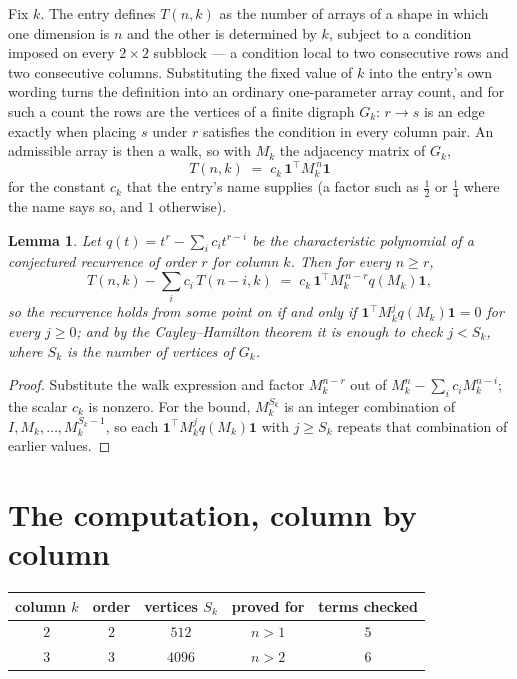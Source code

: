 \documentclass[11pt,a4paper]{article}
\theoremstyle{plain}
\newtheorem{lemma}[theorem]{Lemma}
\theoremstyle{definition}
\begin{document}
Fix $k$. The entry defines $T(n,k)$ as the number of arrays of a shape in which one dimension
is $n$ and the other is determined by $k$, subject to a condition imposed on every
$2\times2$ subblock --- a condition local to two consecutive rows and two consecutive columns.
Substituting the fixed value of $k$ into the entry's own wording turns the definition into an
ordinary one-parameter array count, and for such a count the rows are the vertices of a finite
digraph $G_k$: $r\to s$ is an edge exactly when placing $s$ under $r$ satisfies the condition
in every column pair. An admissible array is then a walk, so with $M_k$ the adjacency matrix
of $G_k$,
\[
T(n,k)\;=\;c_k\,\mathbf{1}^{\!\top}M_k^{\,n}\mathbf{1}
\]
for the constant $c_k$ that the entry's name supplies (a factor such as $\tfrac12$ or
$\tfrac14$ where the name says so, and $1$ otherwise).

\begin{lemma}\label{lem:crit}
Let $q(t)=t^{r}-\sum_i c_it^{r-i}$ be the characteristic polynomial of a conjectured
recurrence of order $r$ for column $k$. Then for every $n\ge r$,
\[
T(n,k)-\sum_i c_i\,T(n-i,k)\;=\;c_k\,\mathbf{1}^{\!\top}M_k^{\,n-r}q(M_k)\mathbf{1},
\]
so the recurrence holds from some point on if and only if
$\mathbf{1}^{\!\top}M_k^{j}q(M_k)\mathbf{1}=0$ for every $j\ge0$; and by the
Cayley--Hamilton theorem it is enough to check $j<S_k$, where $S_k$ is the number of vertices
of $G_k$.
\end{lemma}

\begin{proof}
Substitute the walk expression and factor $M_k^{n-r}$ out of $M_k^{n}-\sum_ic_iM_k^{n-i}$;
the scalar $c_k$ is nonzero. For the bound, $M_k^{S_k}$ is an integer combination of
$I,M_k,\dots,M_k^{S_k-1}$, so each $\mathbf{1}^{\!\top}M_k^{j}q(M_k)\mathbf{1}$ with
$j\ge S_k$ repeats that combination of earlier values.
\end{proof}

\section{The computation, column by column}

\begin{center}
\begin{tabular}{ccccc}
column $k$ & order & vertices $S_k$ & proved for & terms checked \\ \hline
$2$ & $2$ & $512$ & $n>1$ & $5$ \\
$3$ & $3$ & $4096$ & $n>2$ & $6$ \\
\end{tabular}
\end{center}
\end{document}
